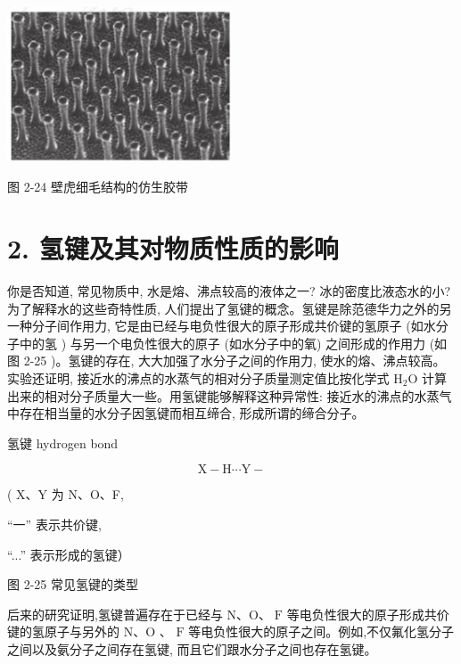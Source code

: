 \documentclass[10pt]{article}
\begin{document}
\begin{center}
\includegraphics[max width=0.5\textwidth]{images/0190e026-5a11-7df7-bd27-54d09026ba7a_59_864580.jpg}
\end{center}

图 2-24 壁虎细毛结构的仿生胶带

\section*{2. 氢键及其对物质性质的影响}

你是否知道, 常见物质中, 水是熔、沸点较高的液体之一? 冰的密度比液态水的小? 为了解释水的这些奇特性质, 人们提出了氢键的概念。氢键是除范德华力之外的另一种分子间作用力, 它是由已经与电负性很大的原子形成共价键的氢原子 (如水分子中的氢 ) 与另一个电负性很大的原子 (如水分子中的氧) 之间形成的作用力 (如图 2-25 )。氢键的存在, 大大加强了水分子之间的作用力, 使水的熔、沸点较高。实验还证明, 接近水的沸点的水蒸气的相对分子质量测定值比按化学式 \({\mathrm{H}}_{2}\mathrm{O}\) 计算出来的相对分子质量大一些。用氢键能够解释这种异常性: 接近水的沸点的水蒸气中存在相当量的水分子因氢键而相互缔合, 形成所谓的缔合分子。

\begin{mdframed}

氢键 hydrogen bond

\end{mdframed}

\begin{mdframed}

\[
\mathrm{X} - \mathrm{H}\cdots \mathrm{Y} -
\]

( X、Y 为 N、O、F,

“一” 表示共价键,

“...” 表示形成的氢键）

图 2-25 常见氢键的类型

\end{mdframed}

后来的研究证明,氢键普遍存在于已经与 \(\mathrm{N}\text{、}\mathrm{O}\text{、}\mathrm{\;F}\) 等电负性很大的原子形成共价键的氢原子与另外的 \(\mathrm{N}\text{、}\mathrm{O}\) 、 \(\mathrm{F}\) 等电负性很大的原子之间。例如,不仅氟化氢分子之间以及氨分子之间存在氢键, 而且它们跟水分子之间也存在氢键。
\end{document}
